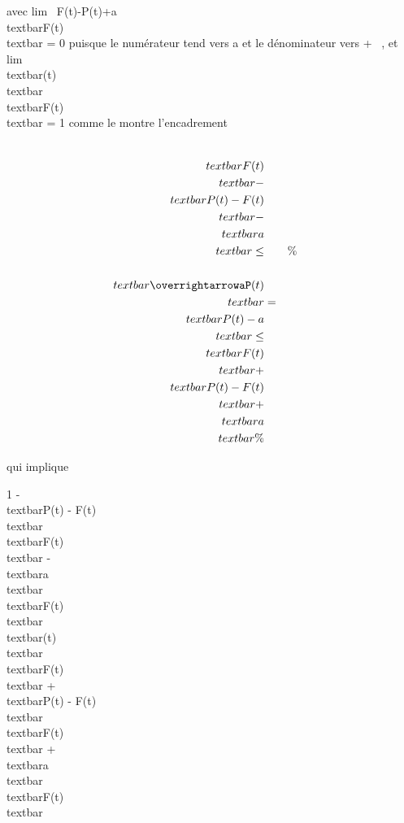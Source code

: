 \documentclass[]{article}
\begin{document}
avec lim~ F(t)-P(t)+a \over
\\textbar{}F(t)\\textbar{} = 0 puisque
le numérateur tend vers a et le dénominateur vers + \infty~, et
lim~
\\textbar{}\overrightarrowaP(t)\\textbar{}
\over
\\textbar{}F(t)\\textbar{} = 1 comme le
montre l'encadrement

\begin{align*}
\\textbar{}F(t)\\textbar{}
-\\textbar{} P(t) - F(t)\\textbar{}
-\\textbar{} a\\textbar{} \leq&& \%&
\\
\\textbar{}\overrightarrowaP(t)\\textbar{}&
=& \\textbar{}P(t) - a\\textbar{}
\leq\\textbar{} F(t)\\textbar{}
+\\textbar{} P(t) - F(t)\\textbar{}
+\\textbar{} a\\textbar{}\%&
\\ \end{align*}

qui implique

1 - \\textbar{}P(t) - F(t)\\textbar{}
\over
\\textbar{}F(t)\\textbar{} -
\\textbar{}a\\textbar{}
\over
\\textbar{}F(t)\\textbar{} \leq
\\textbar{}\overrightarrowaP(t)\\textbar{}
\over
\\textbar{}F(t)\\textbar{}  +
\\textbar{}P(t) - F(t)\\textbar{}
\over
\\textbar{}F(t)\\textbar{} +
\\textbar{}a\\textbar{}
\over
\\textbar{}F(t)\\textbar{}
\end{document}
